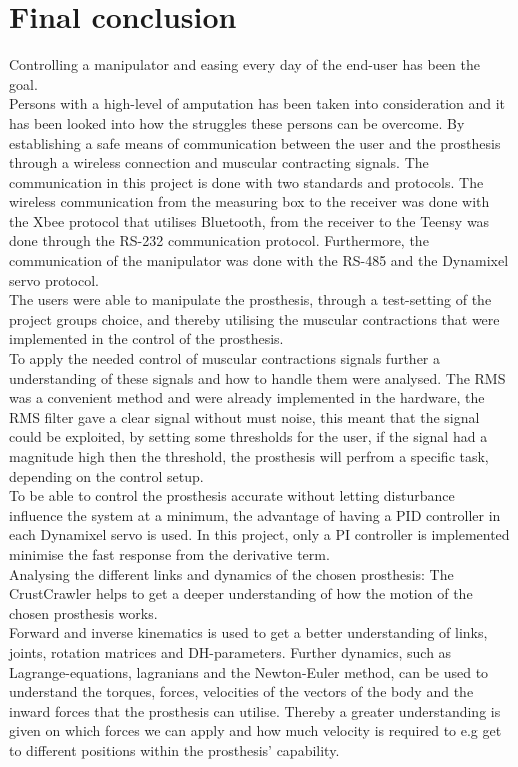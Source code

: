\chapter{Final conclusion}\label{cp:Final-conclusion}

Controlling a manipulator and easing every day of the end-user has been the goal.\\
Persons with a high-level of amputation has been taken into consideration and it has been looked into how the struggles these persons can be overcome. By establishing a safe means of communication between the user and the prosthesis through a wireless connection and muscular contracting signals. The communication in this project is done with two standards and protocols. The wireless communication from the measuring box to the receiver was done with the Xbee protocol that utilises Bluetooth, from the receiver to the Teensy was done through the RS-232 communication protocol. Furthermore, the communication of the manipulator was done with the RS-485 and the Dynamixel servo protocol. \\
The users were able to manipulate the prosthesis, through a test-setting of the project groups choice, and thereby utilising the muscular contractions that were implemented in the control of the prosthesis.\\
To apply the needed control of muscular contractions signals further a understanding of these signals and how to handle them were analysed. The RMS was a convenient method and were already implemented in the hardware, the RMS filter gave a clear signal without must noise, this meant that the signal could be exploited, by setting some thresholds for the user, if the signal had a magnitude high then the threshold, the prosthesis will perfrom a specific task, depending on the control setup.\\
To be able to control the prosthesis accurate without letting disturbance influence the system at a minimum, the advantage of having a PID controller in each Dynamixel servo is used. In this project, only a PI controller is implemented minimise the fast response from the derivative term.\\
Analysing the different links and dynamics of the chosen prosthesis: The CrustCrawler helps to get a deeper understanding of how the motion of the chosen prosthesis works.\\
Forward and inverse kinematics is used to get a better understanding of links, joints, rotation matrices and DH-parameters. Further dynamics, such as Lagrange-equations, lagranians and the Newton-Euler method, can be used to understand the torques, forces, velocities of the vectors of the body and the inward forces that the prosthesis can utilise. Thereby a greater understanding is given on which forces we can apply and how much velocity is required to e.g get to different positions within the prosthesis' capability.\\
